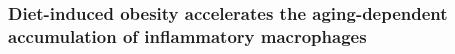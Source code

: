 
\subsubsection{Diet-induced obesity accelerates the aging-dependent accumulation of inflammatory macrophages}


